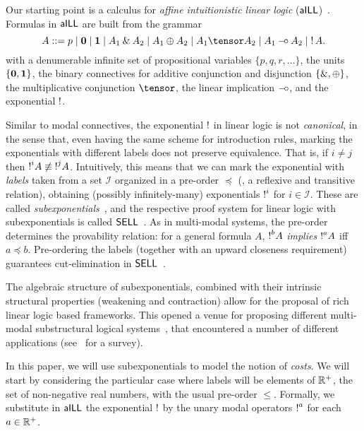 
Our starting point is a calculus for \emph{affine intuitionistic linear logic} ($\textsf{aILL}$)~\cite{DBLP:journals/tcs/Girard87}. Formulas in $\textsf{aILL}$ are built from the grammar 
$$
 A ::= p \mid \zero \mid \one  
 \mid A_1 \with A_2  \mid A_1 
 \oplus A_2 \mid   A_1 \tensor A_2
  \mid A_1 \lolli A_2\mid \bang A.
$$
with a denumerable infinite set of propositional variables $\{p, q, r, \ldots\}$, the units $\{{\bf 0},{\bf 1}\}$,  the binary connectives for additive conjunction and disjunction $\{\mathbin{\&},\oplus\}$, the multiplicative conjunction $\tensor$, the  linear implication $\mathbin{-\hspace{-0.70mm}\circ}$, and the exponential $\mathop{!}$.

Similar to modal connectives, the exponential $\mathop{!}$ in linear logic  is not {\em canonical}, in the sense that, even having the same scheme for introduction rules, marking the exponentials with different labels  does not preserve equivalence. That is, if  $i\not= j$ then
$\hbox{$\mathop{!}^{i}$}A\not\equiv\hbox{$\mathop{!}^{j}$}A$.
%
Intuitively, this means that we can mark the exponential with {\em labels} taken from a set $\mathcal{I}$ organized in a pre-order $\preceq$ (\ie, a reflexive and transitive relation), obtaining (possibly infinitely-many) exponentials $\hbox{$\mathop{!}^{i}$}$
for $i\in\mathcal{I}$. These are called {\em subexponentials}~\cite{DBLP:conf/kgc/DanosJS93}, and the respective proof system for linear logic with subexponentials is called $\textsf{SELL}$~\cite{DBLP:journals/jar/NigamM10}.
As in multi-modal systems, the pre-order  determines the provability relation: 
for a general formula $A$, $\hbox{$\mathop{!}^{b}$}A$ {\em implies} $\hbox{$\mathop{!}^{a}$}A$ iff $a \preceq b$.
%
Pre-ordering the labels (together with an upward closeness requirement)
guarantees cut-elimination in $\textsf{SELL}$~\cite{DBLP:conf/kgc/DanosJS93}.

The algebraic structure of subexponentials, combined with their intrinsic structural properties (weakening and contraction) allow for the proposal of rich linear logic based frameworks. This opened a venue for proposing different multi-modal substructural logical systems~\cite{DBLP:journals/mscs/XavierOP22}, that encountered a number of different applications (see~\cite{DBLP:conf/fscd/PimentelON21} for a survey). 

In this paper, we will use subexponentials to model the notion of {\em costs}. We will start by considering the particular case where labels will be elements of $\mathbb{R}^+$, the set of non-negative real numbers, with the usual pre-order $\leq$. Formally, we substitute in $\textsf{aILL}$
the exponential $\mathop{!}$ by the unary modal operators $\hbox{$\mathop{!}^{a}$}$ 
for each $a\in\mathbb{R}^+$. 

